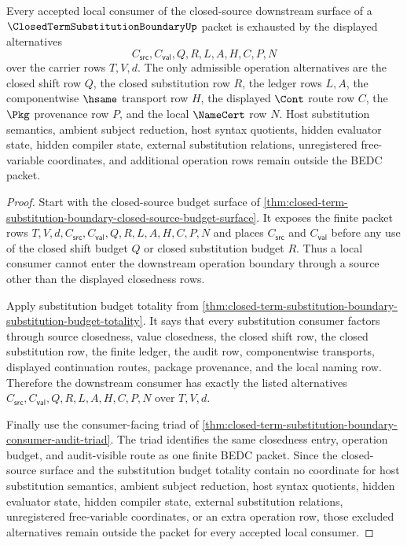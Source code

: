 \begin{theorem}
\label{thm:closed-term-substitution-boundary-closed-source-downstream-coverage}
Every accepted local consumer of the closed-source downstream surface of a $\ClosedTermSubstitutionBoundaryUp$ packet is exhausted by the displayed alternatives
$$
C_{\mathsf{src}},C_{\mathsf{val}},Q,R,L,A,H,C,P,N
$$
over the carrier rows $T,V,d$. The only admissible operation alternatives are the closed shift row $Q$, the closed substitution row $R$, the ledger rows $L,A$, the componentwise $\hsame$ transport row $H$, the displayed $\Cont$ route row $C$, the $\Pkg$ provenance row $P$, and the local $\NameCert$ row $N$. Host substitution semantics, ambient subject reduction, host syntax quotients, hidden evaluator state, hidden compiler state, external substitution relations, unregistered free-variable coordinates, and additional operation rows remain outside the BEDC packet.
\end{theorem}
\begin{proof}
Start with the closed-source budget surface of \autoref{thm:closed-term-substitution-boundary-closed-source-budget-surface}. It exposes the finite packet rows $T,V,d,C_{\mathsf{src}},C_{\mathsf{val}},Q,R,L,A,H,C,P,N$ and places $C_{\mathsf{src}}$ and $C_{\mathsf{val}}$ before any use of the closed shift budget $Q$ or closed substitution budget $R$. Thus a local consumer cannot enter the downstream operation boundary through a source other than the displayed closedness rows.

Apply substitution budget totality from \autoref{thm:closed-term-substitution-boundary-substitution-budget-totality}. It says that every substitution consumer factors through source closedness, value closedness, the closed shift row, the closed substitution row, the finite ledger, the audit row, componentwise transports, displayed continuation routes, package provenance, and the local naming row. Therefore the downstream consumer has exactly the listed alternatives $C_{\mathsf{src}},C_{\mathsf{val}},Q,R,L,A,H,C,P,N$ over $T,V,d$.

Finally use the consumer-facing triad of \autoref{thm:closed-term-substitution-boundary-consumer-audit-triad}. The triad identifies the same closedness entry, operation budget, and audit-visible route as one finite BEDC packet. Since the closed-source surface and the substitution budget totality contain no coordinate for host substitution semantics, ambient subject reduction, host syntax quotients, hidden evaluator state, hidden compiler state, external substitution relations, unregistered free-variable coordinates, or an extra operation row, those excluded alternatives remain outside the packet for every accepted local consumer.
\end{proof}
